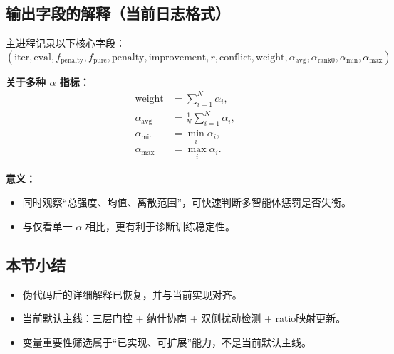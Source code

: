 \documentclass[11pt,a3paper]{ctexart}
\begin{document}
\subsection{输出字段的解释（当前日志格式）}
主进程记录以下核心字段：
\begin{equation}
(\text{iter},\text{eval},f_{\text{penalty}},f_{\text{pure}},\text{penalty},\text{improvement},r,\text{conflict},\text{weight},\alpha_{\text{avg}},\alpha_{\text{rank0}},\alpha_{\min},\alpha_{\max})
\end{equation}

\textbf{关于多种 $\alpha$ 指标：}
\begin{align}
\text{weight} &= \sum_{i=1}^{N}\alpha_i, \\
\alpha_{\text{avg}} &= \frac{1}{N}\sum_{i=1}^{N}\alpha_i, \\
\alpha_{\min} &= \min_i \alpha_i, \\
\alpha_{\max} &= \max_i \alpha_i.
\end{align}

\textbf{意义：}
\begin{itemize}
    \item 同时观察“总强度、均值、离散范围”，可快速判断多智能体惩罚是否失衡。
    \item 与仅看单一 $\alpha$ 相比，更有利于诊断训练稳定性。
\end{itemize}

\subsection{本节小结}
\begin{itemize}
    \item 伪代码后的详细解释已恢复，并与当前实现对齐。
    \item 当前默认主线：三层门控 + 纳什协商 + 双侧扰动检测 + ratio映射更新。
    \item 变量重要性筛选属于“已实现、可扩展”能力，不是当前默认主线。
\end{itemize}
\end{document}
